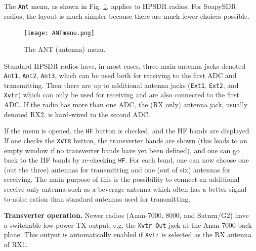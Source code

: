 \documentclass[12pt]{book}
\def\rett#1{\texttt{\color{red}#1}}
\def\bltt#1{\texttt{\color{blue}#1}}
\begin{document}
The \bltt{Ant} menu, as shown in Fig. \ref{fig:ANTmenu},
applies to HPSDR radios. For SoapySDR radios, the layout
is much simpler because there are much fewer choices possible.

\begin{figure}[ht]
\center
\texttt{[image: ANTmenu.png]}
\caption{The ANT (antenna) menu.}
\label{fig:ANTmenu}
\end{figure}

Standard HPSDR radios have, in most cases, three main antenna jacks
denoted \rett{Ant1}, \rett{Ant2}, \rett{Ant3}, which can be used both for receiving to
the first ADC and
transmitting. Then there are up to additional antenna jacks (\rett{Ext1}, \rett{Ext2},
and \rett{Xvtr}) which can only be used for receiving and are also connected
to the first ADC. If the radio has more than one ADC, the (RX only)
antenna jack, usually denoted RX2, is hard-wired to the second ADC.

If the menu is opened, the \rett{HF} button is checked, and the HF bands
are displayed. If one checks the \rett{XVTR} button, the transverter bands
are shown (this leads to an empty window if no transverter bands have
yet been defined), and one can go back to the HF bands by re-checking
\rett{HF}.
For each band, one can now choose one (out the three) antennas for
transmitting and one (out of six) antennas for receiving. The main purpose
of this is the possibility to connect an additional receive-only antenna
such as a beverage antenna which often has a better signal-to-noise
ration than standard antennas used for transmitting.

\textbf{Transverter operation.} Newer radios (Anan-7000, 8000, and Saturn/G2) have a
switchable low-power TX output, e.g. the \texttt{Xvtr Out} jack at the Anan-7000 back plane.
This output is automatically enabled if \rett{Xvtr} is selected as the RX antenna of RX1.
\end{document}
